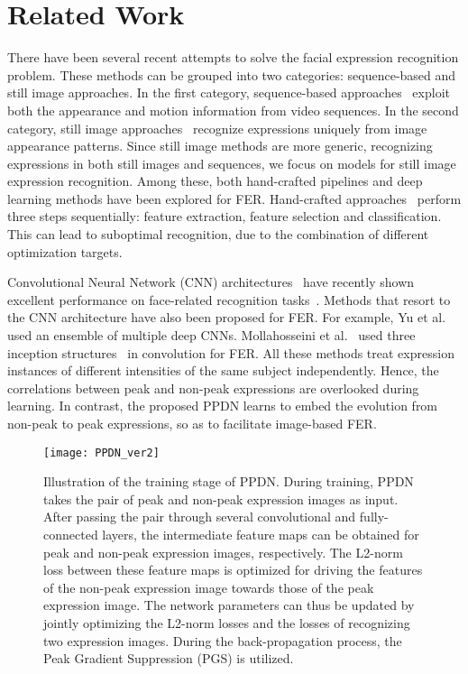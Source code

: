 \documentclass[runningheads]{llncs}
\begin{document}
\section{Related Work}

There have been several recent attempts to solve the facial expression 
recognition problem. These methods can be grouped into two categories: 
sequence-based and still image approaches. In the first category, 
sequence-based approaches~\cite{jung2015joint,liu2014learning,guo2012dynamic,zhao2011facial,klaser2008spatio}  exploit both the appearance and motion 
information from video sequences. In the second category, still image 
approaches~\cite{zhong2012learning,liu2014facial,kahou2014facial} recognize 
expressions uniquely from image appearance patterns. Since still image 
methods are more generic, recognizing 
expressions in both still images and sequences, we focus on models for 
still image expression recognition. Among these, both hand-crafted pipelines 
and deep learning methods have been explored for FER. Hand-crafted 
approaches~\cite{zhong2012learning,sikka2012exploring,shan2009facial} perform three steps sequentially: feature extraction, feature selection 
and classification. This can lead to suboptimal recognition, due to 
the combination of different optimization targets. 

Convolutional Neural Network (CNN) 
architectures~\cite{krizhevsky2012imagenet,szegedy2015going,simonyan2014very} 
have recently shown excellent performance on face-related recognition 
tasks~\cite{sun2014deep,zhu2013deep,yim2015rotating}. Methods that resort to the 
CNN architecture have also been proposed for FER. For example, Yu et 
al.~\cite{yu2015image} used an ensemble of multiple deep
CNNs. Mollahosseini et 
al.~\cite{mollahosseini2015going} used three inception 
structures~\cite{szegedy2015going} in convolution for FER. All these methods
treat expression instances of different intensities of the same subject 
independently. Hence, the correlations between peak and non-peak 
expressions are overlooked during learning. In contrast, the proposed PPDN 
learns to embed the evolution from non-peak to peak expressions, so as 
to facilitate image-based FER. 





\begin{figure}[t]
	\centering
	\texttt{[image: PPDN\_ver2]}
	\caption{Illustration of the training stage of PPDN. During training, PPDN takes the pair of peak and non-peak expression images as input. After passing the pair through several convolutional and fully-connected layers, the intermediate feature maps can be obtained for peak and non-peak expression images, respectively. The L2-norm loss between these feature maps is optimized for driving the features of the non-peak expression image towards those of the peak expression image. The network parameters can thus be updated by jointly optimizing the L2-norm losses and the losses of recognizing two expression images. During the back-propagation process, the Peak Gradient Suppression (PGS) is utilized.}
	\label{fig:architecture}
\end{figure}
\end{document}
